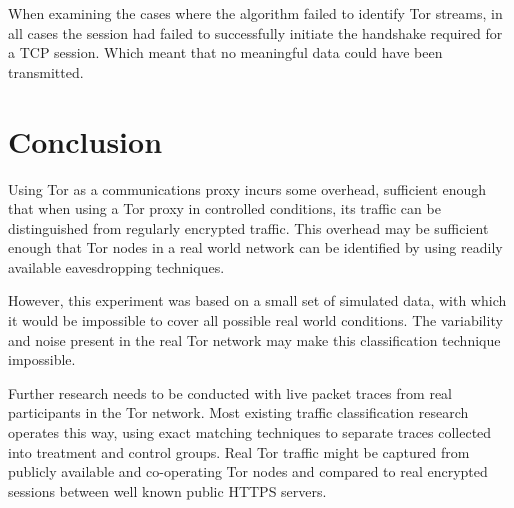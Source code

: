 \documentclass[conference]{IEEEtran}
\begin{document}
When examining the cases where the algorithm failed to identify Tor streams, in
all cases the session had failed to successfully initiate the handshake
required for a TCP session. Which meant that no meaningful data could have been
transmitted.



\section{Conclusion}

Using Tor as a communications proxy incurs some overhead, sufficient enough
that when using a Tor proxy in controlled conditions, its traffic can be
distinguished from regularly encrypted traffic. This overhead may be sufficient
enough that Tor nodes in a real world network can be identified by using
readily available eavesdropping techniques.

However, this experiment was based on a small set of simulated data, with which
it would be impossible to cover all possible real world conditions. The
variability and noise present in the real Tor network may make this
classification technique impossible.

Further research needs to be conducted with live packet traces from real
participants in the Tor network. Most existing traffic classification research
operates this way, using exact matching techniques to separate traces collected
into treatment and control groups. Real Tor traffic might be captured from
publicly available and co-operating Tor nodes and compared to real encrypted
sessions between well known public HTTPS servers.

\printbibliography
\end{document}
